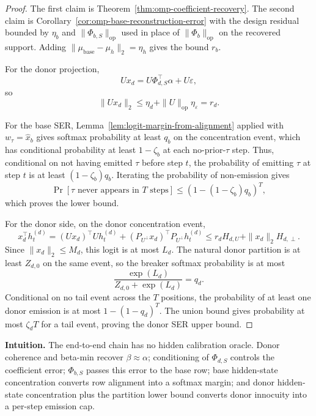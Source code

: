 \begin{proof}
The first claim is Theorem~\ref{thm:omp-coefficient-recovery}. The second claim is Corollary~\ref{cor:omp-base-reconstruction-error} with the design residual bounded by $\eta_b$ and $\|\Phi_{b,S}\|_{\mathrm{op}}$ used in place of $\|\Phi_b\|_{\mathrm{op}}$ on the recovered support. Adding $\|\mu_{\text{base}}-\mu_h\|_2=\eta_h$ gives the bound $r_b$.

For the donor projection,
\[
Ux_d=U\Phi_{d,S}^\top\alpha+U\varepsilon,
\]
so
\[
\|Ux_d\|_2
\le
\eta_d+\|U\|_{\mathrm{op}}\eta_\varepsilon
=r_d.
\]

For the base SER, Lemma~\ref{lem:logit-margin-from-alignment} applied with $w_\tau=\widehat{x}_b$ gives softmax probability at least $q_b$ on the concentration event, which has conditional probability at least $1-\zeta_b$ at each no-prior-$\tau$ step. Thus, conditional on not having emitted $\tau$ before step $t$, the probability of emitting $\tau$ at step $t$ is at least $(1-\zeta_b)q_b$. Iterating the probability of non-emission gives
\[
\Pr[\tau\text{ never appears in }T\text{ steps}]
\le
\left(1-(1-\zeta_b)q_b\right)^T,
\]
which proves the lower bound.

For the donor side, on the donor concentration event,
\[
x_d^\top h_t^{(d)}
=
(Ux_d)^\top Uh_t^{(d)}+(P_{U^\perp}x_d)^\top P_{U^\perp}h_t^{(d)}
\le
r_dH_{d,U}+\|x_d\|_2H_{d,\perp}.
\]
Since $\|x_d\|_2\le M_d$, this logit is at most $L_d$. The natural donor partition is at least $Z_{d,0}$ on the same event, so the breaker softmax probability is at most
\[
\frac{\exp(L_d)}{Z_{d,0}+\exp(L_d)}=q_d.
\]
Conditional on no tail event across the $T$ positions, the probability of at least one donor emission is at most $1-(1-q_d)^T$. The union bound gives probability at most $\zeta_d T$ for a tail event, proving the donor SER upper bound.
\end{proof}

\noindent\textbf{Intuition.}
The end-to-end chain has no hidden calibration oracle. Donor coherence and beta-min recover $\beta\approx\alpha$; conditioning of $\Phi_{d,S}$ controls the coefficient error; $\Phi_{b,S}$ passes this error to the base row; base hidden-state concentration converts row alignment into a softmax margin; and donor hidden-state concentration plus the partition lower bound converts donor innocuity into a per-step emission cap.
